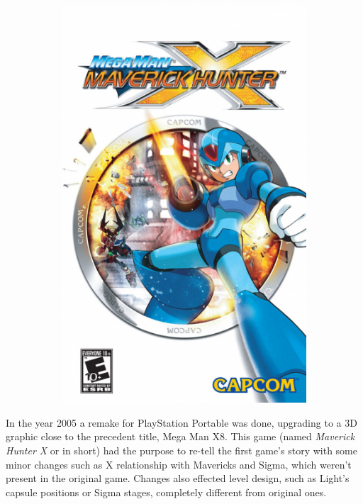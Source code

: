 \begin{figure}[htp]
\begin{subfigure}{0.4\linewidth}
		\includegraphics[width=\linewidth]{figures/X1/mmxmh.png}
	\end{subfigure}
\end{figure}

In the year 2005 a remake for PlayStation Portable was done, upgrading to a 3D graphic close to the precedent title, Mega Man X8. This game (named \textit{Maverick Hunter X }or \mhx in short) had the purpose to re-tell the first game's story with some minor changes such as X relationship with Mavericks and Sigma, which weren't present in the original game. Changes also effected level design, such as Light's capsule positions or Sigma stages, completely different from original ones.



